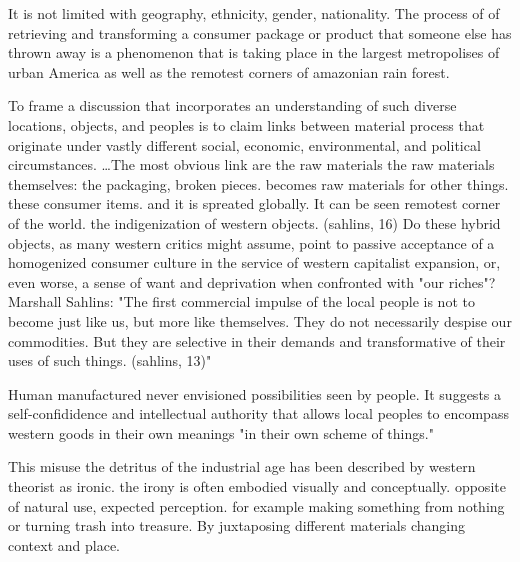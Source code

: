  It is not limited with geography, ethnicity, gender, nationality. The process of of retrieving and transforming a consumer package or product that someone else has thrown away is a phenomenon that is taking place in the largest metropolises of urban America as well as the remotest corners of amazonian rain forest. 

 To frame a discussion that incorporates an understanding of such diverse locations, objects, and peoples is to claim links between material process that originate under vastly different social, economic, environmental, and political circumstances. \ldots The most obvious link are the raw materials the raw materials themselves: the packaging, broken pieces. becomes raw materials for other things. these consumer items. and it is spreated globally. It can be seen remotest corner of the world. the indigenization of western objects. (sahlins, 16) Do these hybrid objects, as many western critics might assume, point to passive acceptance of a homogenized consumer culture in the service of western capitalist expansion, or, even worse, a sense of want and deprivation when confronted with "our riches"? Marshall Sahlins: "The first commercial impulse of the local people is not to become just like us, but more like themselves. They do not necessarily despise our commodities. But they are selective in their demands and transformative of their uses of such things. (sahlins, 13)" 

 Human manufactured never envisioned possibilities seen by people. It suggests a self-confididence and intellectual authority that allows local peoples to encompass western goods in their own meanings "in their own scheme of things." 

 This misuse the detritus of the industrial age has been described by western theorist as ironic. the irony is often embodied visually and conceptually. opposite of natural use, expected perception. for example making something from nothing or turning trash into treasure. By juxtaposing different materials changing context and place. 



